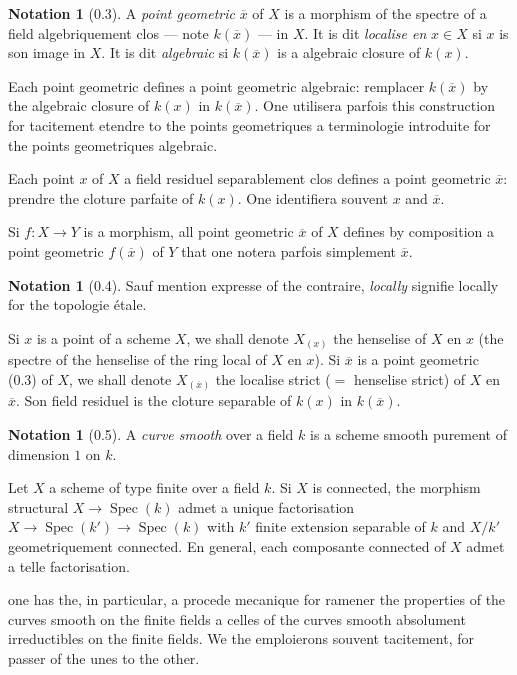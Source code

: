 \documentclass[12pt,a4paper]{article}
\theoremstyle{plain}
\theoremstyle{definition}
\newtheorem{notation}[theorem]{Notation}
\theoremstyle{definition}
\theoremstyle{remark}
\DeclareMathOperator{\Spec}{Spec}
\begin{document}
\begin{notation}[0.3]
A \emph{point geometric} $\overline{x}$ of $X$ is a morphism of the spectre of a field algebriquement clos --- note $k(\overline{x})$ --- in $X$. It is dit \emph{localise en} $x \in X$ si $x$ is son image in $X$. It is dit \emph{algebraic} si $k(\overline{x})$ is a algebraic closure of $k(x)$.

Each point geometric defines a point geometric algebraic: remplacer $k(\overline{x})$ by the algebraic closure of $k(x)$ in $k(\overline{x})$. One utilisera parfois this construction for tacitement etendre to the points geometriques a terminologie introduite for the points geometriques algebraic.

Each point $x$ of $X$ a field residuel separablement clos defines a point geometric $\overline{x}$: prendre the cloture parfaite of $k(x)$. One identifiera souvent $x$ and $\overline{x}$.

Si $f: X \to Y$ is a morphism, all point geometric $\overline{x}$ of $X$ defines by composition a point geometric $f(\overline{x})$ of $Y$ that one notera parfois simplement $\overline{x}$.
\end{notation}

\begin{notation}[0.4]
Sauf mention expresse of the contraire, \emph{locally} signifie locally for the topologie étale.

Si $x$ is a point of a scheme $X$, we shall denote $X_{(x)}$ the henselise of $X$ en $x$ (the spectre of the henselise of the ring local of $X$ en $x$). Si $\overline{x}$ is a point geometric (0.3) of $X$, we shall denote $X_{(\overline{x})}$ the localise strict ($=$ henselise strict) of $X$ en $\overline{x}$. Son field residuel is the cloture separable of $k(x)$ in $k(\overline{x})$.
\end{notation}

\begin{notation}[0.5]
A \emph{curve smooth} over a field $k$ is a scheme smooth purement of dimension $1$ on $k$.

Let $X$ a scheme of type finite over a field $k$. Si $X$ is connected, the morphism structural $X \to \Spec(k)$ admet a unique factorisation $X \to \Spec(k') \to \Spec(k)$ with $k'$ finite extension separable of $k$ and $X/k'$ geometriquement connected. En general, each composante connected of $X$ admet a telle factorisation.

one has the, in particular, a procede mecanique for ramener the properties of the curves smooth on the finite fields a celles of the curves smooth absolument irreductibles on the finite fields. We the emploierons souvent tacitement, for passer of the unes to the other.
\end{notation}
\end{document}
